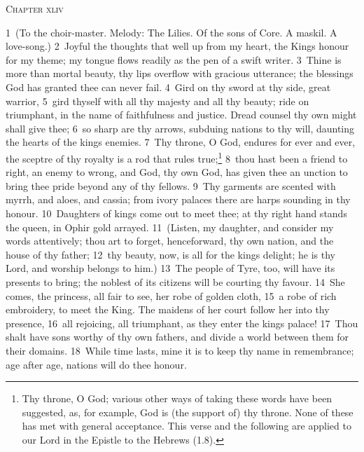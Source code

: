 \documentclass[10pt]{book} %
\begin{document}
\begin{large}\begin{center}\textsc{Chapter xliv}\end{center}\end{large}
\textcolor{benred8}{1}~(To the choir-master. Melody: The Lilies. Of the sons of Core. A maskil. A love-song.)
\textcolor{benred8}{2}~Joyful the thoughts that well up from my heart, the King\textquotesingle s honour for my theme; my tongue flows readily as the pen of a swift writer. \textcolor{benred8}{3}~Thine is more than mortal beauty, thy lips overflow with gracious utterance; the blessings God has granted thee can never fail. \textcolor{benred8}{4}~Gird on thy sword at thy side, great warrior, \textcolor{benred8}{5}~gird thyself with all thy majesty and all thy beauty; ride on triumphant, in the name of faithfulness and justice. Dread counsel thy own might shall give thee; \textcolor{benred8}{6}~so sharp are thy arrows, subduing nations to thy will, daunting the hearts of the king\textquotesingle s enemies. \textcolor{benred8}{7}~Thy throne, O God, endures for ever and ever, the sceptre of thy royalty is a rod that rules true;\footnote[1]{\textasciigrave Thy throne, O God\textquotesingle ; various other ways of taking these words have been suggested, as, for example, \textasciigrave God is (the support of) thy throne\textquotesingle . None of these has met with general acceptance. This verse and the following are applied to our Lord in the Epistle to the Hebrews (1.8).} \textcolor{benred8}{8}~thou hast been a friend to right, an enemy to wrong, and God, thy own God, has given thee an unction to bring thee pride beyond any of thy fellows. \textcolor{benred8}{9}~Thy garments are scented with myrrh, and aloes, and cassia; from ivory palaces there are harps sounding in thy honour. \textcolor{benred8}{10}~Daughters of kings come out to meet thee; at thy right hand stands the queen, in Ophir gold arrayed. \textcolor{benred8}{11}~(Listen, my daughter, and consider my words attentively; thou art to forget, henceforward, thy own nation, and the house of thy father; \textcolor{benred8}{12}~thy beauty, now, is all for the king\textquotesingle s delight; he is thy Lord, and worship belongs to him.) \textcolor{benred8}{13}~The people of Tyre, too, will have its presents to bring; the noblest of its citizens will be courting thy favour. \textcolor{benred8}{14}~She comes, the princess, all fair to see, her robe of golden cloth, \textcolor{benred8}{15}~a robe of rich embroidery, to meet the King. The maidens of her court follow her into thy presence, \textcolor{benred8}{16}~all rejoicing, all triumphant, as they enter the king\textquotesingle s palace! \textcolor{benred8}{17}~Thou shalt have sons worthy of thy own fathers, and divide a world between them for their domains. \textcolor{benred8}{18}~While time lasts, mine it is to keep thy name in remembrance; age after age, nations will do thee honour.
\end{document}
